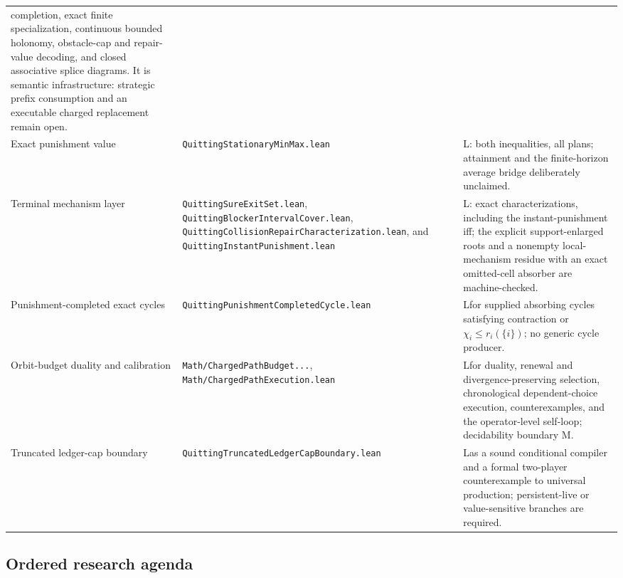 \documentclass[11pt]{article}
\newcommand{\LTag}{\textsf{L}}
\newcommand{\MTag}{\textsf{M}}
\newcommand{\Prod}{\LTag}
\newcommand{\Audit}{\MTag}
\begin{document}
\begin{longtable}{@{}p{}p{}p{}@{}}
completion, exact finite specialization, continuous bounded holonomy,
obstacle-cap and repair-value decoding, and closed associative splice diagrams.
It is semantic infrastructure: strategic prefix consumption and an executable
charged replacement remain open.\\
Exact punishment value &
\texttt{QuittingStationaryMinMax.lean} &
\Prod: both inequalities, all plans; attainment and the finite-horizon
average bridge deliberately unclaimed.\\
Terminal mechanism layer &
\texttt{QuittingSureExitSet.lean},
\texttt{QuittingBlockerIntervalCover.lean},
\texttt{QuittingCollisionRepairCharacterization.lean}, and
\texttt{QuittingInstantPunishment.lean} &
\Prod: exact characterizations, including the instant-punishment iff; the
explicit support-enlarged roots and a nonempty local-mechanism residue with an
exact omitted-cell absorber are machine-checked.\\
Punishment-completed exact cycles &
\texttt{QuittingPunishmentCompletedCycle.lean} &
\Prod for supplied absorbing cycles satisfying contraction or
\(\chi_i\leq r_i(\{i\})\); no generic cycle producer.\\
Orbit-budget duality and calibration &
\texttt{Math/ChargedPathBudget...}, \texttt{Math/ChargedPathExecution.lean} &
\Prod for duality, renewal and divergence-preserving selection, chronological
dependent-choice execution, counterexamples, and the operator-level self-loop;
decidability boundary \Audit.\\
Truncated ledger-cap boundary &
\texttt{QuittingTruncatedLedgerCapBoundary.lean} &
\Prod as a sound conditional compiler and a formal two-player counterexample
to universal production; persistent-live or value-sensitive branches are
required.\\
\bottomrule
\end{longtable}

\subsection{Ordered research agenda}
\end{document}
